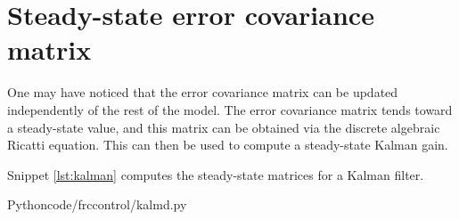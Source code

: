 \section{Steady-state error covariance matrix}

One may have noticed that the error covariance matrix can be updated
independently of the rest of the model. The error covariance matrix tends
toward a steady-state value, and this matrix can be obtained via the discrete
algebraic Ricatti equation. This can then be used to compute a steady-state
Kalman gain.

Snippet \ref{lst:kalman} computes the steady-state matrices for a Kalman
filter.

\begin{code}{Python}{code/frccontrol/kalmd.py}
  \caption{Steady-state Kalman gain and error covariance matrices calculation in
    Python.}
  \label{lst:kalman}
\end{code}
